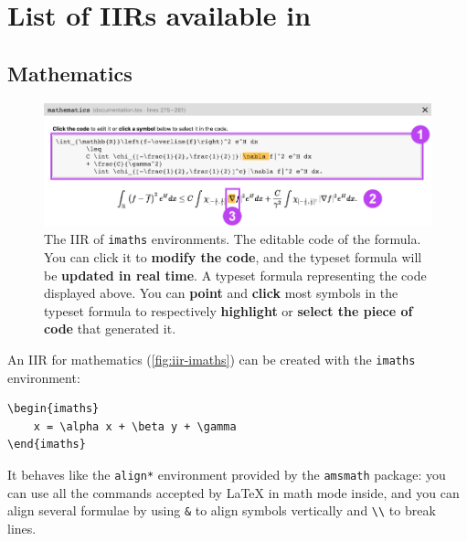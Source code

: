 \documentclass[11pt, a4paper]{article}
\begin{document}

\newpage
\section{List of IIRs available in \iLaTeX{}}

\subsection{Mathematics}

\begin{figure}[hb!]
    \centering
    \includegraphics[width = \textwidth]{img/iir-imaths.png}
    \caption{The IIR of \texttt{imaths} environments.  The editable code of the formula. You can click it to \textbf{modify the code}, and the typeset formula will be \textbf{updated in real time}.  A typeset formula representing the code displayed above.  You can \textbf{point} and \textbf{click} most symbols in the typeset formula to respectively \textbf{highlight} or \textbf{select the piece of code} that generated it.}
    \label{fig:iir-imaths}
\end{figure}

An IIR for mathematics (\autoref{fig:iir-imaths}) can be created with the \texttt{imaths} environment:

\begin{lstlisting}[style=custom-latex]
\begin{imaths}
    x = \alpha x + \beta y + \gamma
\end{imaths}
\end{lstlisting}

It behaves like the \texttt{align*} environment provided by the \texttt{amsmath} package: you can use all the commands accepted by \LaTeX{} in math mode inside, and you can align several formulae by using \verb|&| to align symbols vertically and \verb|\\| to break lines.

\end{document}
